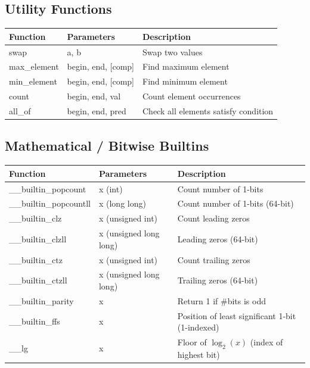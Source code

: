 \documentclass[10pt,letterpaper,landscape,twocolumn]{article}
\begin{document}
\subsection*{Utility Functions}
\begin{tabularx}{\linewidth}{|l|l|X|}
    \hline
    \textbf{Function} & \textbf{Parameters} & \textbf{Description} \\
    \hline
    swap & a, b & Swap two values \\
    \hline
    max\_element & begin, end, [comp] & Find maximum element \\
    \hline
    min\_element & begin, end, [comp] & Find minimum element \\
    \hline
    count & begin, end, val & Count element occurrences \\
    \hline
    all\_of & begin, end, pred & Check all elements satisfy condition \\
    \hline
\end{tabularx}

\subsection*{Mathematical / Bitwise Builtins}
\begin{tabularx}{\linewidth}{|l|l|X|}
    \hline
    \textbf{Function} & \textbf{Parameters} & \textbf{Description} \\
    \hline
    \_\_builtin\_popcount & x (int) & Count number of 1-bits \\
    \hline
    \_\_builtin\_popcountll & x (long long) & Count number of 1-bits (64-bit) \\
    \hline
    \_\_builtin\_clz & x (unsigned int) & Count leading zeros \\
    \hline
    \_\_builtin\_clzll & x (unsigned long long) & Leading zeros (64-bit) \\
    \hline
    \_\_builtin\_ctz & x (unsigned int) & Count trailing zeros \\
    \hline
    \_\_builtin\_ctzll & x (unsigned long long) & Trailing zeros (64-bit) \\
    \hline
    \_\_builtin\_parity & x & Return 1 if \#bits is odd \\
    \hline
    \_\_builtin\_ffs & x & Position of least significant 1-bit (1-indexed) \\
    \hline
    \_\_lg & x & Floor of $\log_2(x)$ (index of highest bit) \\
    \hline
\end{tabularx}
\end{document}
